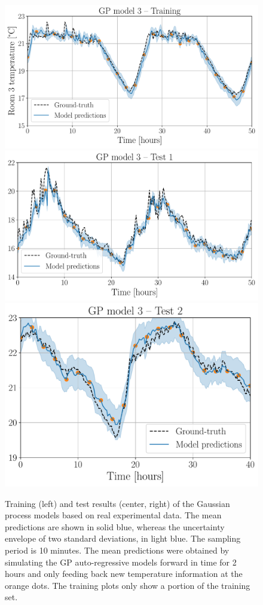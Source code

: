 \begin{figure}[!t]
	\includegraphics[scale=0.29]{../images/chap3_room_3_temp_model_train.pdf}  \\[4pt]
	\includegraphics[scale=0.29]{../images/chap3_room_3_temp_model_test1.pdf}
	\includegraphics[scale=0.29]{../images/chap3_room_3_temp_model_test2.pdf}
	\caption{Training (left) and test results (center, right) of the Gaussian process models based on real experimental data. The mean predictions are shown in solid blue, whereas the uncertainty envelope of two standard deviations, in light blue. The sampling period is 10 minutes. The mean predictions were obtained by simulating the GP auto-regressive models forward in time for 2 hours and only feeding back new temperature information at the orange dots. The training plots only show a portion of the training set.}
	\label{fig.trainTestRes}
\end{figure}

